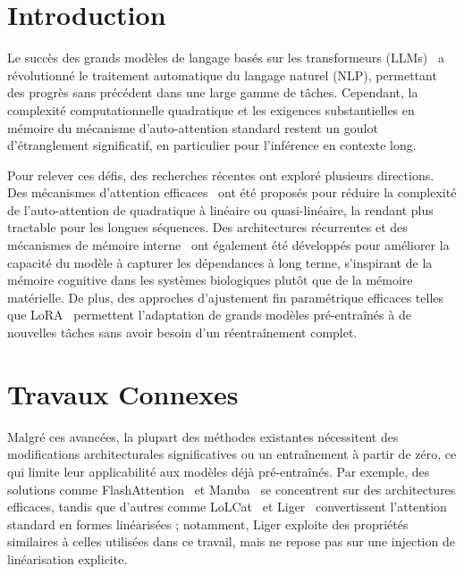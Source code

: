 \documentclass[10pt,a4paper]{article}
\begin{document}
\section{Introduction}

Le succès des grands modèles de langage basés sur les transformeurs (LLMs)~\cite{vaswani2017attention, mann2020language} a révolutionné le traitement automatique du langage naturel (NLP), permettant des progrès sans précédent dans une large gamme de tâches. Cependant, la complexité computationnelle quadratique et les exigences substantielles en mémoire du mécanisme d'auto-attention standard restent un goulot d'étranglement significatif, en particulier pour l'inférence en contexte long.

Pour relever ces défis, des recherches récentes ont exploré plusieurs directions. Des mécanismes d'attention efficaces~\cite{katharopoulos2020transformers, yang2024parallelizing} ont été proposés pour réduire la complexité de l'auto-attention de quadratique à linéaire ou quasi-linéaire, la rendant plus tractable pour les longues séquences. Des architectures récurrentes et des mécanismes de mémoire interne~\cite{mercat2024linearizing, behrouz2024titans} ont également été développés pour améliorer la capacité du modèle à capturer les dépendances à long terme, s'inspirant de la mémoire cognitive dans les systèmes biologiques plutôt que de la mémoire matérielle. De plus, des approches d'ajustement fin paramétrique efficaces telles que LoRA~\cite{hu2022lora} permettent l'adaptation de grands modèles pré-entraînés à de nouvelles tâches sans avoir besoin d'un réentraînement complet.

\section{Travaux Connexes}

Malgré ces avancées, la plupart des méthodes existantes nécessitent des modifications architecturales significatives ou un entraînement à partir de zéro, ce qui limite leur applicabilité aux modèles déjà pré-entraînés. Par exemple, des solutions comme FlashAttention~\cite{dao2023flashattention} et Mamba~\cite{gu2023mamba} se concentrent sur des architectures efficaces, tandis que d'autres comme LoLCat~\cite{zhang2024lolcats} et Liger~\cite{lan2025liger} convertissent l'attention standard en formes linéarisées ; notamment, Liger exploite des propriétés similaires à celles utilisées dans ce travail, mais ne repose pas sur une injection de linéarisation explicite.
\end{document}
